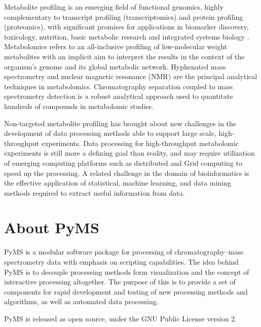 Metabolite profiling is an emerging field of functional genomics,
highly complementary to transcript profiling (transcriptomics) and
protein profiling (proteomics), with significant promises for
applications in biomarker discovery, toxicology, nutrition, basic
metabolic research and integrated systems biology \cite{fiehn00,allen03}.
Metabolomics refers to an all-inclusive profiling of low-molecular
weight metabolites with an implicit aim to interpret the results
in the context of the organism's genome and its global metabolic
network. Hyphenated mass spectrometry and nuclear magnetic resonance
(NMR) are the principal analytical techniques in metabolomics.
Chromatography separation coupled to mass spectrometry detection
is a robust analytical approach used to quantitate hundreds of
compounds in metabolomic studies.

Non-targeted metabolite profiling has brought about new challenges
in the development of data processing methods able to support
large scale, high-throughput experiments. Data processing for
high-throughput metabolomic experiments is still more a defining
goal than reality, and may require utilization of emerging computing
platforms such as distributed and Grid computing to speed up the
processing. A related challenge in the domain of bioinformatics
is the effective application of statistical, machine learning,
and data mining methods required to extract useful information
from data.

\section{About PyMS}

PyMS is a modular software package for processing of
chromatography--mass spectrometry data with emphasis on scripting
capabilities. The idea behind PyMS is to decouple processing
methods form visualization and the concept of interactive
processing altogether. The purpose of this is to provide a set
of components for rapid development and testing of new processing
methods and algorithms, as well as automated data processing.

PyMS is released as open source, under the GNU Public License
version 2.  

